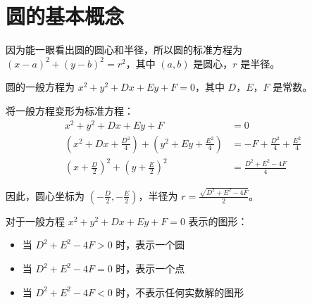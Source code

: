 \pagebreak

\section{圆的基本概念}

\begin{definition}[圆的标准方程]
    因为能一眼看出圆的圆心和半径，所以圆的标准方程为 $(x-a)^2+(y-b)^2=r^2$，其中 $(a,b)$ 是圆心，$r$ 是半径。

    \begin{center}
    \end{center}
\end{definition}

\begin{definition}[圆的一般方程]
    圆的一般方程为 $x^2+y^2+Dx+Ey+F=0$，其中 $D$，$E$，$F$ 是常数。

    将一般方程变形为标准方程：
    \begin{align}
        x^2+y^2+Dx+Ey+F                                                       & = 0                              \\
        \left(x^2+Dx+\frac{D^2}{4}\right) + \left(y^2+Ey+\frac{E^2}{4}\right) & = -F+\frac{D^2}{4}+\frac{E^2}{4} \\
        \left(x+\frac{D}{2}\right)^2 + \left(y+\frac{E}{2}\right)^2           & = \frac{D^2+E^2-4F}{4}
    \end{align}

    因此，圆心坐标为 $\left(-\frac{D}{2}, -\frac{E}{2}\right)$，半径为 $r = \frac{\sqrt{D^2+E^2-4F}}{2}$。
\end{definition}

\begin{theorem}
    对于一般方程 $x^2+y^2+Dx+Ey+F=0$ 表示的图形：
    \begin{itemize}
        \item 当 $D^2+E^2-4F > 0$ 时，表示一个圆
        \item 当 $D^2+E^2-4F = 0$ 时，表示一个点
        \item 当 $D^2+E^2-4F < 0$ 时，不表示任何实数解的图形
    \end{itemize}
\end{theorem}